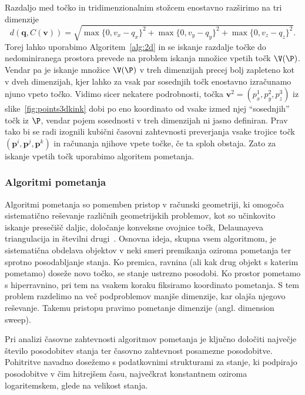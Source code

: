 Razdaljo med točko in tridimenzionalnim stožcem enostavno razširimo na tri dimenzije
\[
d(\textbf{q}, C(\textbf{v})) = \sqrt{\max \{0, v_x - q_x\}^2 + \max \{0, v_y - q_y\}^2 + \max \{0, v_z - q_z\}^2}. 
\]
Torej lahko uporabimo Algoritem~\ref{alg:2d} in se iskanje razdalje točke do nedominiranega prostora prevede na problem iskanja množice vpetih točk $\V(\P)$. Vendar pa je iskanje množice $\V(\P)$ v treh dimenzijah precej bolj zapleteno kot v dveh dimenzijah, kjer lahko za vsak par sosednjih točk enostavno izračunamo njuno vpeto točko. Vidimo sicer nekatere podrobnosti, točka $\textbf{v}^2 = (p^1_x, p^2_y, p^3_z)$ iz slike~\ref{fig:points3dkink} dobi po eno koordinato od vsake izmed njej ``sosednjih'' točk iz $\P$, vendar pojem sosednosti v treh dimenzijah ni jasno definiran. Prav tako bi se radi izognili kubični časovni zahtevnosti preverjanja vsake trojice točk $(\textbf{p}^i, \textbf{p}^j, \textbf{p}^k)$ in računanja njihove vpete točke, če ta sploh obstaja. Zato za iskanje vpetih točk uporabimo algoritem pometanja.  

\subsubsection{Algoritmi pometanja}
Algoritmi pometanja so pomemben pristop v računski geometriji, ki omogoča sistematično reševanje različnih geometrijskih problemov, kot so učinkovito iskanje presečišč daljic, določanje konveksne ovojnice točk, Delaunayeva triangulacija in številni drugi~\cite{BergCheongKreveldOvermars2008}. 
Osnovna ideja, skupna vsem algoritmom, je sistematična obdelava objektov v neki smeri premikanja oziroma pometanja ter sprotno posodabljanje stanja. Ko premica, ravnina (ali kak drug objekt s katerim pometamo) doseže novo točko, se stanje ustrezno posodobi. 
Ko prostor pometamo s hiperravnino, pri tem na vsakem koraku fiksiramo koordinato pometanja. S tem problem razdelimo na več podproblemov manjše dimenzije, kar olajša njegovo reševanje. Takemu pristopu pravimo pometanje dimenzije (angl. dimension sweep).

Pri analizi časovne zahtevnosti algoritmov pometanja je ključno določiti največje število posodobitev stanja ter časovno zahtevnost posamezne posodobitve. Pohitritve navadno dosežemo s podatkovnimi strukturami za stanje, ki podpirajo posodobitve v čim hitrejšem času, največkrat konstantnem oziroma logaritemskem, glede na velikost stanja. 

